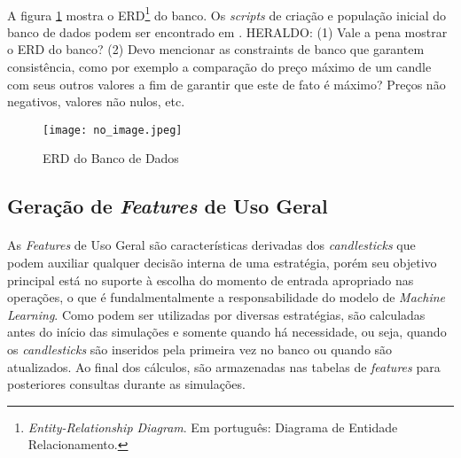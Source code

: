
\paragraph{} A figura \ref{fig:103} mostra o ERD\footnote{\textit{Entity-Relationship Diagram}. Em português: Diagrama de Entidade Relacionamento.} do banco. Os \textit{scripts} de criação e população inicial do banco de dados podem ser encontrado em \cite{github_projeto}. \color{red} HERALDO: (1) Vale a pena mostrar o ERD do banco? (2) Devo mencionar as constraints de banco que garantem consistência, como por exemplo a comparação do preço máximo de um candle com seus outros valores a fim de garantir que este de fato é máximo? Preços não negativos, valores não nulos, etc. 

\begin{figure}[h]
    \texttt{[image: no\_image.jpeg]}
    \centering
    \caption{ERD do Banco de Dados}
    \label{fig:103}
\end{figure}



\subsection{Geração de \textit{Features} de Uso Geral}
\label{sub:features}

\paragraph{} As \textit{Features} de Uso Geral são características derivadas dos \textit{candlesticks} que podem auxiliar qualquer decisão interna de uma estratégia, porém seu objetivo principal está no suporte à escolha do momento de entrada apropriado nas operações, o que é fundalmentalmente a responsabilidade do modelo de \textit{Machine Learning}. Como podem ser utilizadas por diversas estratégias, são calculadas antes do início das simulações e somente quando há necessidade, ou seja, quando os \textit{candlesticks} são inseridos pela primeira vez no banco ou quando são atualizados. Ao final dos cálculos, são armazenadas nas tabelas de \textit{features} para posteriores consultas durante as simulações.

